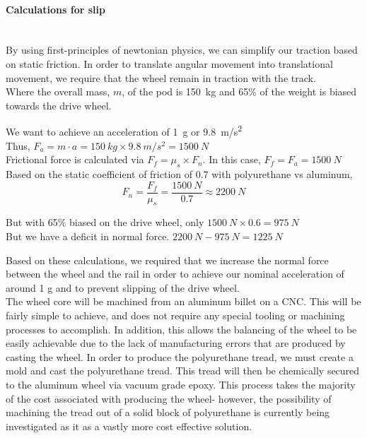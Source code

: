 \documentclass{report}
\let\oldparagraph\paragraph
\renewcommand{\paragraph}[1]{\oldparagraph{#1}\mbox{}\\}
\begin{document}
    \paragraph{Calculations for slip}
    By using first-principles of newtonian physics, we can simplify our traction based on static friction. In order to translate angular movement into translational movement, we require that the wheel remain in traction with the track.\\
    
    Where the overall mass, $m$, of the pod is \SI{150}{kg} and 65\% of the weight is biased towards the drive wheel.
    
    \begin{center}
        We want to achieve an acceleration of \SI{1}{g} or \SI{9.8}{m/s^2}\\
        
        Thus, $F_a=m\cdot a = \SI{150}{kg} \times \SI{9.8}{m/s^2} = \SI{1500}{N}$\\
        
        Frictional force is calculated via $F_f=\mu_s \times F_n$. In this case, $F_f=F_a=\SI{1500}{N}$\\
        
        Based on the static coefficient of friction of 0.7 with polyurethane vs aluminum,
        \[
        F_n = \frac{F_f}{\mu_s} = \frac{\SI{1500}{N}}{0.7} \approx \SI{2200}{N}
        \]
        
        But with 65\% biased on the drive wheel, only $\SI{1500}{N} \times 0.6 = \SI{975}{N}$\\
        
        But we have a deficit in normal force. $\SI{2200}{N} -\SI{975}{N}=\SI{1225}{N}$
    \end{center}
    Based on these calculations, we required that we increase the normal force between the wheel and the rail in order to achieve our nominal acceleration of around 1 g and to prevent slipping of the drive wheel.\\
    
    The wheel core will be machined from an aluminum billet on a CNC. This will be fairly simple to achieve, and does not require any special tooling or machining processes to accomplish. In addition, this allows the balancing of the wheel to be easily achievable due to the lack of manufacturing errors that are produced by casting the wheel. In order to produce the polyurethane tread, we must create a mold and cast the polyurethane tread. This tread will then be chemically secured to the aluminum wheel via vacuum grade epoxy. This process takes the majority of the cost associated with producing the wheel- however, the possibility of machining the tread out of a solid block of polyurethane is currently being investigated as it as a vastly more cost effective solution.
    
\end{document}
